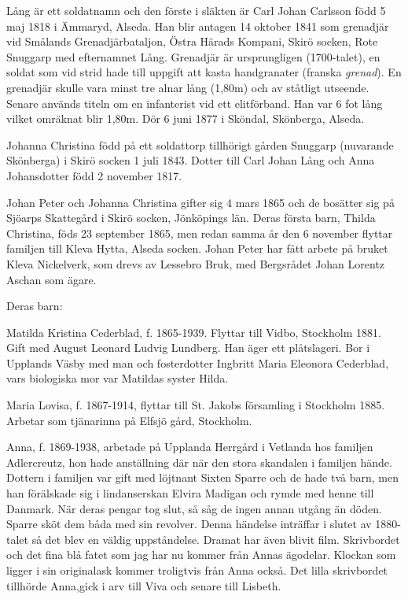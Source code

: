 Lång är ett soldatnamn och den förste i släkten är Carl Johan Carlsson född 5 maj 1818 i Ämmaryd, Alseda. Han blir antagen 14 oktober 1841 som grenadjär vid Smålands Grenadjärbataljon, Östra Härads Kompani, Skirö socken, Rote Snuggarp med efternamnet Lång. Grenadjär är ursprungligen (1700-talet), en soldat som vid strid hade till uppgift att kasta handgranater (franska {\it grenad\kern1pt}). En grenadjär skulle vara minst tre alnar lång (1,80m) och av ståtligt utseende. Senare används titeln om en infanterist vid ett elitförband.
Han var 6 fot lång vilket omräknat blir 1,80m.
Dör 6 juni 1877 i Sköndal, Skönberga, Alseda.

Johanna Christina född på ett soldattorp tillhörigt gården Snuggarp (nuvarande Skönberga) i Skirö socken 1 juli 1843. Dotter till Carl Johan Lång och Anna Johansdotter född 2 november 1817. 



Johan Peter och Johanna Christina gifter sig 4 mars 1865 och de bosätter sig på Sjöarps Skattegård i Skirö socken, Jönköpings län. Deras första barn, Thilda Christina, föds 23 september 1865, men redan samma år den 6 november flyttar familjen till Kleva Hytta, Alseda socken. Johan Peter har fått arbete på bruket Kleva Nickelverk, som drevs av Lessebro Bruk, med Bergsrådet Johan Lorentz Aschan som ägare. 

Deras barn:

Matilda Kristina Cederblad, f. 1865-1939. Flyttar till Vidbo, Stockholm 1881. Gift med August Leonard Ludvig Lundberg. Han äger ett plåtslageri. Bor i Upplands Väsby med man och fosterdotter Ingbritt Maria Eleonora Cederblad, vars biologiska mor var Matildas syster Hilda.

Maria Lovisa, f. 1867-1914, flyttar till St. Jakobs församling i Stockholm 1885. Arbetar som tjänarinna på Elfsjö gård, Stockholm.

Anna, f. 1869-1938, arbetade på Upplanda Herrgård i Vetlanda hos familjen Adlercreutz, hon hade anställning där när den stora skandalen i familjen hände. Dottern i familjen var gift med löjtnant Sixten Sparre och de hade två barn, men han förälskade sig i  lindanserskan Elvira Madigan och rymde med henne till Danmark. När deras pengar tog slut, så såg de ingen annan utgång än döden. Sparre sköt dem båda med sin revolver. Denna händelse inträffar i slutet av 1880-talet så det blev en väldig uppståndelse. Dramat har även blivit film. Skrivbordet och det fina blå fatet som jag har nu  kommer från Annas ägodelar. Klockan som ligger i sin originalask kommer troligtvis från Anna också. Det lilla skrivbordet tillhörde Anna,gick i arv till Viva och senare till Lisbeth.


